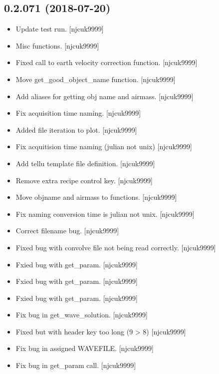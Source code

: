 \documentclass[a4paper,10pt,english]{report}
\begin{document}
\subsection{0.2.071 (2018-07-20)}
\label{\detokenize{misc/changelog:id385}}\begin{itemize}
\item {} 
Update test run. {[}njcuk9999{]}

\item {} 
Misc functions. {[}njcuk9999{]}

\item {} 
Fixed call to earth velocity correction function. {[}njcuk9999{]}

\item {} 
Move get\_good\_object\_name function. {[}njcuk9999{]}

\item {} 
Add aliases for getting obj name and airmass. {[}njcuk9999{]}

\item {} 
Fix acquisition time naming. {[}njcuk9999{]}

\item {} 
Added file iteration to plot. {[}njcuk9999{]}

\item {} 
Fix acquitision time naming (julian not unix) {[}njcuk9999{]}

\item {} 
Add tellu template file definition. {[}njcuk9999{]}

\item {} 
Remove extra recipe control key. {[}njcuk9999{]}

\item {} 
Move objname and airmass to functions. {[}njcuk9999{]}

\item {} 
Fix naming conversion time is julian not unix. {[}njcuk9999{]}

\item {} 
Correct filename bug. {[}njcuk9999{]}

\item {} 
Fixed bug with convolve file not being read correctly. {[}njcuk9999{]}

\item {} 
Fxied bug with get\_param. {[}njcuk9999{]}

\item {} 
Fxied bug with get\_param. {[}njcuk9999{]}

\item {} 
Fxied bug with get\_param. {[}njcuk9999{]}

\item {} 
Fix bug in get\_wave\_solution. {[}njcuk9999{]}

\item {} 
Fixed but with header key too long (9 \textgreater{} 8) {[}njcuk9999{]}

\item {} 
Fix bug in assigned WAVEFILE. {[}njcuk9999{]}

\item {} 
Fix bug in get\_param call. {[}njcuk9999{]}

\end{itemize}
\end{document}
